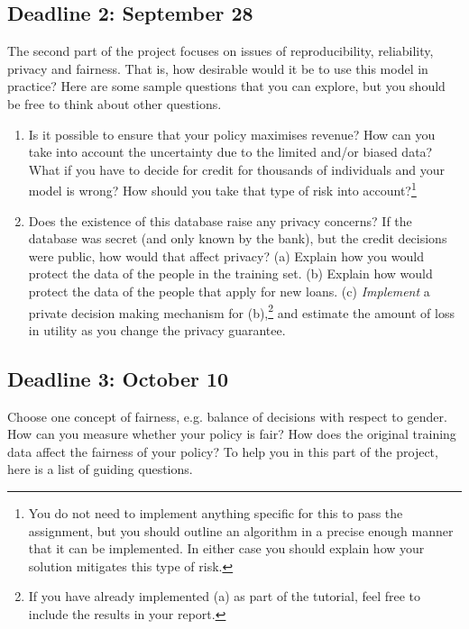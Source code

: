 \subsection{Deadline 2: September 28}
The second part of the project focuses on issues of reproducibility, reliability, privacy and fairness. That is, how desirable would it be to use this model in practice? Here are some sample questions that you can explore, but you should be free to think about other questions.
\begin{enumerate}
\item Is it possible to ensure that your policy maximises revenue? How can you take into account the uncertainty due to the limited and/or biased data? What if you have to decide for credit for thousands of individuals and your model is wrong? How should you take that type of risk into account?\footnote{You do not need to implement anything specific for this to pass the assignment, but you should outline an algorithm in a precise enough manner that it can be implemented. In either case you should explain how your solution mitigates this type of risk.}
\item Does the existence of this database raise any privacy concerns? If the database was secret (and only known by the bank), but the credit decisions were public, how would that affect privacy? (a) Explain how you would protect the data of the people in the training set. (b) Explain how would protect the data of the people that apply for new loans. (c) \emph{Implement} a private decision making mechanism for (b),\footnote{If you have already implemented (a) as part of the tutorial, feel free to include the results in your report.} and estimate the amount of loss in utility as you change the privacy guarantee.
\end{enumerate}

\subsection{Deadline 3: October 10}

 Choose one concept of fairness, e.g. balance of decisions with respect to gender. How can you measure whether your policy is fair? How does the original training data affect the fairness of your policy? To help you in this part of the project, here is a list of guiding questions.

